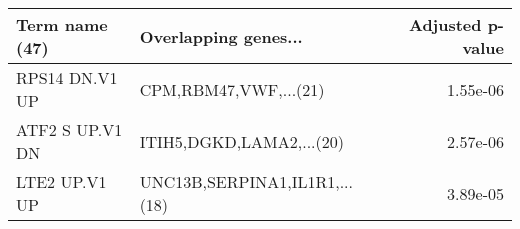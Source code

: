 \begin{tabular}{llr}
\toprule
 Term name (47) &          Overlapping genes... &  Adjusted p-value \\
\midrule
 RPS14 DN.V1 UP &         CPM,RBM47,VWF,...(21) &          1.55e-06 \\
ATF2 S UP.V1 DN &      ITIH5,DGKD,LAMA2,...(20) &          2.57e-06 \\
  LTE2 UP.V1 UP & UNC13B,SERPINA1,IL1R1,...(18) &          3.89e-05 \\
\bottomrule
\end{tabular}
